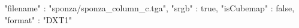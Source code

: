 { 
	"filename" : "sponza/sponza_column_c.tga", 
	"srgb" : true,
	"isCubemap" : false,
	"format" : "DXT1"
}